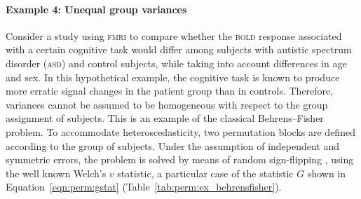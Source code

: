 \paragraph{Example 4: Unequal group variances}  Consider a study using \textsc{fmri} to compare whether the \textsc{bold} response associated with a certain cognitive task would differ among subjects with autistic spectrum disorder (\textsc{asd}) and control subjects, while taking into account differences in age and sex. In this hypothetical example, the cognitive task is known to produce more erratic signal changes in the patient group than in controls. Therefore, variances cannot be assumed to be homogeneous with respect to the group assignment of subjects. This is an example of the classical Behrens--Fisher problem. To accommodate heteroscedasticity, two permutation blocks are defined according to the group of subjects. Under the assumption of independent and symmetric errors, the problem is solved by means of random sign-flipping \citep{Pesarin1995}, using the well known Welch's $v$ statistic, a particular case of the statistic $G$ shown in Equation~\ref{eqn:perm:gstat} (Table~\ref{tab:perm:ex_behrensfisher}).

